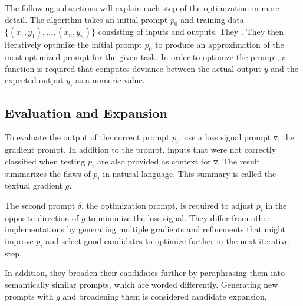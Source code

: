\begin{comment}
TODO: 
\begin{itemize}
    \item add legend
    \item symbolise core loop
\end{itemize}
\end{comment}

The following subsections will explain each step of the \ProTeGi optimization in more detail.
The \ProTeGi algorithm takes an initial prompt $p_0$ and training data $\{(x_1, y_1), \dots, (x_n, y_n)\}$ consisting of inputs and outputs.
They .
They then iteratively optimize the initial prompt $p_0$ to produce an approximation of the most optimized prompt for the given task.
In order to optimize the prompt, a function is required that computes deviance between the actual output $y$ and the expected output $y_i$ as a numeric value.


\subsection{Evaluation and Expansion}
To evaluate the output of the current prompt $p_i$, \citeauthor{pryzant2023AutomaticPrompt} use a loss signal prompt $\triangledown$, the gradient prompt.
In addition to the prompt, inputs that were not correctly classified when testing $p_i$ are also provided as context for $\triangledown$.
The result summarizes the flaws of $p_i$ in natural language.
This summary is called the textual gradient $g$.

The second prompt $\delta$, the optimization prompt, is required to adjust $p_i$ in the opposite direction of $g$ to minimize the loss signal.
They differ from other implementations by generating multiple gradients and refinements that might improve $p_i$ and select good candidates to optimize further in the next iterative step.

In addition, they broaden their candidates further by paraphrasing them into semantically similar prompts, which are worded differently.
Generating new prompts with $g$ and broadening them is considered candidate expansion.


